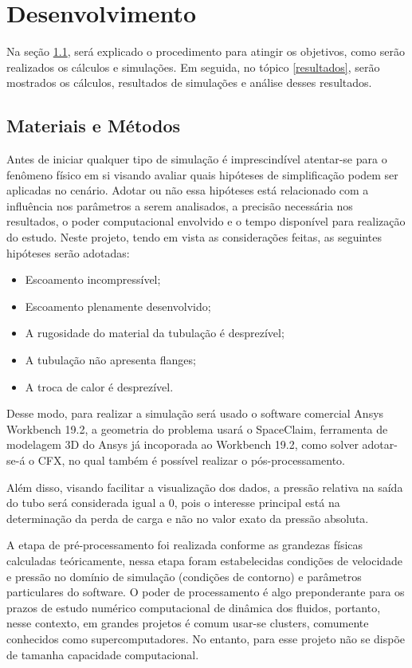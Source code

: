 \documentclass[12pt]{article}
\begin{document}
\section{Desenvolvimento}

Na seção \ref{mm}, será explicado o procedimento para atingir os objetivos, como serão realizados os cálculos e simulações. Em seguida, no tópico \ref{resultados}, serão mostrados os cálculos, resultados de simulações e análise desses resultados.
\subsection{Materiais e Métodos}
\label{mm}
Antes de iniciar qualquer tipo de simulação é imprescindível atentar-se para o fenômeno físico em si visando avaliar quais hipóteses de simplificação podem ser aplicadas no cenário. Adotar ou não essa hipóteses está relacionado com a influência nos parâmetros a serem analisados, a precisão necessária nos resultados, o poder computacional envolvido e o tempo disponível para realização do estudo.
Neste projeto, tendo em vista as considerações feitas, as seguintes hipóteses serão adotadas: 
\begin{itemize}
	\item Escoamento incompressível;
	\item Escoamento plenamente desenvolvido;
	\item A rugosidade do material da tubulação é desprezível;
	\item A tubulação não apresenta flanges;
	\item A troca de calor é desprezível.
\end{itemize}

Desse modo, para realizar a simulação será usado o software comercial Ansys Workbench 19.2, a geometria do problema usará o SpaceClaim, ferramenta de modelagem 3D do Ansys já incoporada ao Workbench 19.2, como solver adotar-se-á o CFX, no qual também é possível realizar o pós-processamento.

Além disso, visando facilitar a visualização dos dados, a pressão relativa na saída do tubo será considerada igual a 0, pois o interesse principal está na determinação da perda de carga e não no valor exato da pressão absoluta. 

A etapa de pré-processamento foi realizada conforme as grandezas físicas calculadas teóricamente, nessa etapa foram estabelecidas condições de velocidade e pressão no domínio de simulação (condições de contorno) e parâmetros particulares do software. O poder de processamento é algo preponderante para os prazos de estudo numérico computacional de dinâmica dos fluidos, portanto, nesse contexto, em grandes projetos é comum usar-se clusters, comumente conhecidos como supercomputadores. No entanto, para esse projeto não se dispõe de tamanha capacidade computacional. 
\end{document}
